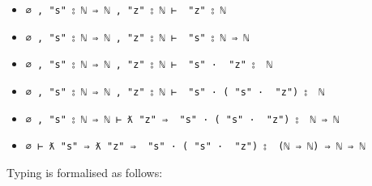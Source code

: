 \begin{itemize}
\tightlist
\item
  \texttt{∅\ ,\ "s"\ ⦂\ \textasciigrave{}ℕ\ ⇒\ \textasciigrave{}ℕ\ ,\ "z"\ ⦂\ \textasciigrave{}ℕ\ ⊢\ \textasciigrave{}\ "z"\ ⦂\ \textasciigrave{}ℕ}
\item
  \texttt{∅\ ,\ "s"\ ⦂\ \textasciigrave{}ℕ\ ⇒\ \textasciigrave{}ℕ\ ,\ "z"\ ⦂\ \textasciigrave{}ℕ\ ⊢\ \textasciigrave{}\ "s"\ ⦂\ \textasciigrave{}ℕ\ ⇒\ \textasciigrave{}ℕ}
\item
  \texttt{∅\ ,\ "s"\ ⦂\ \textasciigrave{}ℕ\ ⇒\ \textasciigrave{}ℕ\ ,\ "z"\ ⦂\ \textasciigrave{}ℕ\ ⊢\ \textasciigrave{}\ "s"\ ·\ \textasciigrave{}\ "z"\ ⦂\ \ \textasciigrave{}ℕ}
\item
  \texttt{∅\ ,\ "s"\ ⦂\ \textasciigrave{}ℕ\ ⇒\ \textasciigrave{}ℕ\ ,\ "z"\ ⦂\ \textasciigrave{}ℕ\ ⊢\ \textasciigrave{}\ "s"\ ·\ (\textasciigrave{}\ "s"\ ·\ \textasciigrave{}\ "z")\ ⦂\ \ \textasciigrave{}ℕ}
\item
  \texttt{∅\ ,\ "s"\ ⦂\ \textasciigrave{}ℕ\ ⇒\ \textasciigrave{}ℕ\ ⊢\ ƛ\ "z"\ ⇒\ \textasciigrave{}\ "s"\ ·\ (\textasciigrave{}\ "s"\ ·\ \textasciigrave{}\ "z")\ ⦂\ \ \textasciigrave{}ℕ\ ⇒\ \textasciigrave{}ℕ}
\item
  \texttt{∅\ ⊢\ ƛ\ "s"\ ⇒\ ƛ\ "z"\ ⇒\ \textasciigrave{}\ "s"\ ·\ (\textasciigrave{}\ "s"\ ·\ \textasciigrave{}\ "z")\ ⦂\ \ (\textasciigrave{}ℕ\ ⇒\ \textasciigrave{}ℕ)\ ⇒\ \textasciigrave{}ℕ\ ⇒\ \textasciigrave{}ℕ}
\end{itemize}

Typing is formalised as follows:

